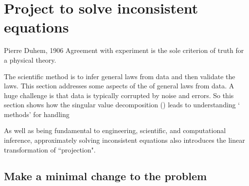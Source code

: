

\section{Project to solve inconsistent equations}
\label{sec:asie}
\secttoc


\begin{comment}
 \cite[Ch.~7, 12]{Chartier2015}
\end{comment}

\begin{quoted}{Pierre Duhem, 1906}
Agreement with experiment is the sole criterion of truth for a physical theory.
\end{quoted}

The scientific method is to infer general laws from data and then validate the laws.
This section addresses some aspects of the  of general laws from data.
A huge challenge is that data is typically corrupted by noise and errors.
So this section shows how the singular value decomposition (\svd) leads to understanding ` methods' for handling 

As well as being fundamental to engineering, scientific, and computational inference, approximately solving inconsistent equations also introduces the linear transformation of ``projection".



\subsection{Make a minimal change to the problem}
\label{sec:mmctp}

\begin{comment}
This first example introduces a new, linear algebra, view of approximation in a context that relates to students and one they know the answer.  
\end{comment}

